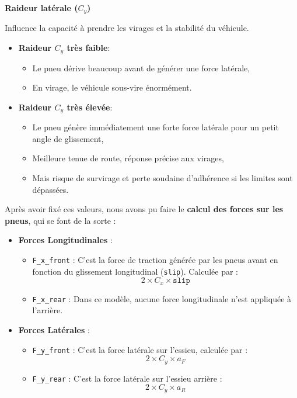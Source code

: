 \textbf{Raideur latérale ($C_y$)}

Influence la capacité à prendre les virages et la stabilité du véhicule.

\begin{itemize}
    \item \textbf{Raideur $C_y$ très faible}:
    \begin{itemize}[label=$\star$]
        \item Le pneu dérive beaucoup avant de générer une force latérale,
        \item En virage, le véhicule sous-vire énormément.
    \end{itemize}

    \item \textbf{Raideur $C_y$ très élevée}:
    \begin{itemize}[label=$\star$]
        \item Le pneu génère immédiatement une forte force latérale pour un petit angle de glissement,
        \item Meilleure tenue de route, réponse précise aux virages,
        \item Mais risque de survirage et perte soudaine d’adhérence si les limites sont dépassées.
    \end{itemize}
\end{itemize}

Après avoir fixé ces valeurs, nous avons pu faire le \textbf{calcul des forces sur les pneus}, qui se font de la sorte :
\begin{itemize}
    \item \textbf{Forces Longitudinales} :
    \begin{itemize}[label=$\star$]
        \item \texttt{F\_x\_front} : C'est la force de traction générée par les pneus avant en fonction du glissement longitudinal (\texttt{slip}). Calculée par : $$2 \times C_x \times \texttt{slip}$$

        \item \texttt{F\_x\_rear} : Dans ce modèle, aucune force longitudinale n'est appliquée à l'arrière.
    \end{itemize}
    \item \textbf{Forces Latérales} :
    \begin{itemize}[label=$\star$]
        \item \texttt{F\_y\_front} : C'est la force latérale sur l'essieu, calculée par : $$2 \times C_y \times a_F$$
        \item \texttt{F\_y\_rear} : C'est la force latérale sur l'essieu arrière : $$2 \times C_y \times a_R$$
    \end{itemize}
\end{itemize}

